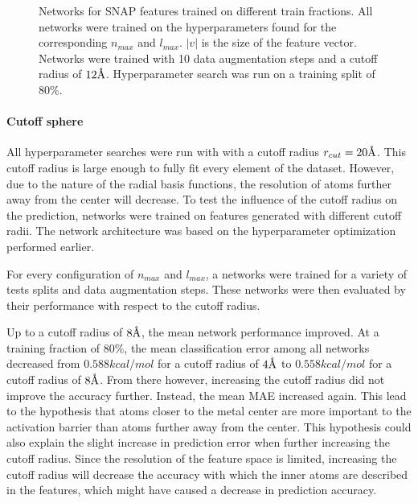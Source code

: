 \begin{figure}[H]
  \endminipage
  \caption[Learning curves for different SNAP resolutions]{
  Networks for SNAP features trained on different train fractions.
  All networks were trained on the hyperparameters found for the corresponding $n_{max}$ and $l_{max}$.
  $|v|$ is the size of the feature vector.
  Networks were trained with 10 data augmentation steps and a cutoff radius of $12 \AA$.
  Hyperparameter search was run on a training split of 80\%.
  }
  \label{fig:snap_hyperparameter}
\end{figure}

\paragraph{Cutoff sphere}
All hyperparameter searches were run with with a cutoff radius $r_{cut} = 20 \AA$.
This cutoff radius is large enough to fully fit every element of the dataset.
However, due to the nature of the radial basis functions, the resolution of atoms 
further away from the center will decrease.
To test the influence of the cutoff radius on the prediction, 
networks were trained on features generated with different cutoff radii.
The network architecture was based on the hyperparameter optimization performed earlier.

For every configuration of $n_{max}$ and $l_{max}$, a networks were trained for a variety 
of tests splits and data augmentation steps.
These networks were then evaluated by their performance with respect to the cutoff radius.

Up to a cutoff radius of $8 \AA$, the mean network performance improved. 
At a training fraction of 80\%, the mean classification error among 
all networks decreased from $0.588 kcal/mol$ for a cutoff radius of $4 \AA$ to 
$0.558 kcal/mol$ for a cutoff radius of $8 \AA$.
From there however, increasing the cutoff radius did not improve the accuracy further.
Instead, the mean MAE increased again.
This lead to the hypothesis that atoms closer to the metal center are more important to the activation barrier than atoms further away from the center.
This hypothesis could also explain the slight increase in prediction error when further increasing the cutoff radius.
Since the resolution of the feature space is limited, increasing the cutoff radius will decrease the accuracy 
with which the inner atoms are described in the features, which might have caused a decrease in prediction accuracy.

